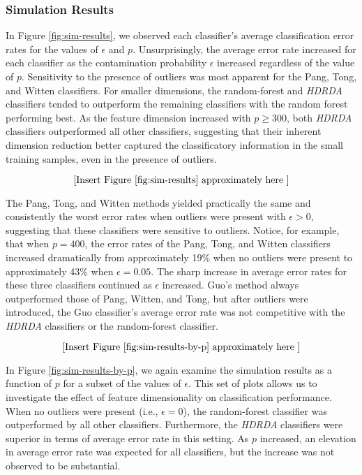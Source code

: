 \documentclass[]{interact}\usepackage[]{graphicx}\usepackage[]{color}
\begin{document}
\subsubsection{Simulation Results}

In Figure \ref{fig:sim-results}, we observed each classifier's average
classification error rates for the values of $\epsilon$ and $p$. Unsurprisingly,
the average error rate increased for each classifier as the contamination
probability $\epsilon$ increased regardless of the value of $p$. Sensitivity to
the presence of outliers was most apparent for the Pang, Tong, and Witten
classifiers. For smaller dimensions, the random-forest and \emph{HDRDA}
classifiers tended to outperform the remaining classifiers with the random
forest performing best. As the feature dimension increased with $p \ge 300$,
both \emph{HDRDA} classifiers outperformed all other classifiers, suggesting
that their inherent dimension reduction better captured the classificatory
information in the small training samples, even in the presence of outliers.

\[ \left[\text{Insert Figure \ref{fig:sim-results} approximately here }\right] \]

The Pang, Tong, and Witten methods yielded practically the same and consistently
the worst error rates when outliers were present with $\epsilon > 0$, suggesting
that these classifiers were sensitive to outliers. Notice, for example, that
when $p=400$, the error rates of the Pang, Tong, and Witten classifiers
increased dramatically from approximately 19\% when no outliers were present to
approximately 43\% when $\epsilon=0.05$. The sharp increase in average error
rates for these three classifiers continued as $\epsilon$ increased. Guo's
method always outperformed those of Pang, Witten, and Tong, but after outliers
were introduced, the Guo classifier's average error rate was not competitive
with the \emph{HDRDA} classifiers or the random-forest classifier.

\[ \left[\text{Insert Figure \ref{fig:sim-results-by-p} approximately here }\right] \]

In Figure \ref{fig:sim-results-by-p}, we again examine the simulation results as
a function of $p$ for a subset of the values of $\epsilon$. This set of plots
allows us to investigate the effect of feature dimensionality on classification
performance. When no outliers were present (i.e., $\epsilon=0$), the
random-forest classifier was outperformed by all other classifiers. Furthermore,
the \emph{HDRDA} classifiers were superior in terms of average error rate in
this setting. As $p$ increased, an elevation in average error rate was expected
for all classifiers, but the increase was not observed to be substantial.
\end{document}
